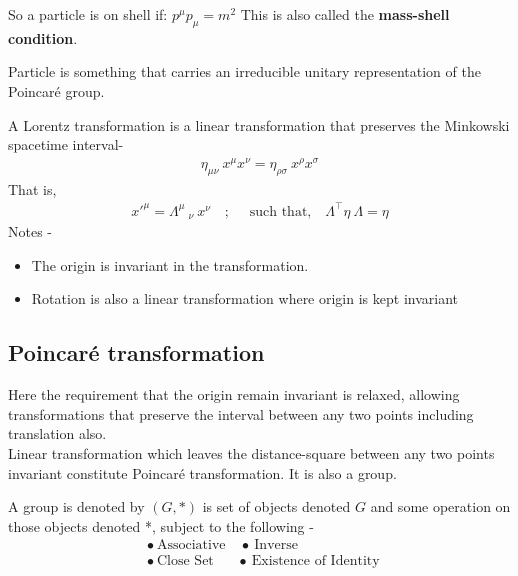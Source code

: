 \documentclass[14pt]{article} %
\begin{document}
So a particle is on shell if: $p^\mu p_\mu = m^2$
This is also called the \textbf{mass-shell condition}.

\begin{tcolorbox}[ title=\textbf{Question: What is a particle?}]
Particle is something that carries an irreducible unitary representation of the Poincaré group.
\end{tcolorbox}
\begin{tcolorbox}[ title=\textbf{Question: What is Lorentz transformation?}]
A Lorentz transformation is a linear transformation that preserves the Minkowski spacetime interval-
\begin{align*}
\eta_{\mu \nu} ~x^\mu x^\nu = \eta_{\rho \sigma} ~x^\rho x^\sigma 
\end{align*}
That is,
\begin{align*}
x'^{\mu} = \Lambda^{\mu}~_{\nu}~x^\nu \quad;\quad \text{ such that,}\quad \Lambda^\top \eta~ \Lambda=\eta
\end{align*}
Notes -
\begin{itemize}
    \item The origin is invariant in the transformation. 
    \item Rotation is also a linear transformation where origin is kept invariant
\end{itemize}
\end{tcolorbox}
\subsection{Poincaré transformation}
Here the requirement that the origin remain invariant is relaxed, allowing transformations that preserve the interval between any two points including translation also. \\

Linear transformation which leaves the distance-square between any two points invariant constitute Poincaré transformation. It is also a group.
\begin{tcolorbox}[ title=\textbf{Question: What are groups? \hfill (set + binary operation)}]
A group is denoted by $(G,*)$ is set of objects denoted $G$ and some operation on those objects denoted *, subject to the following -
\begin{align*}
&\bullet~\text{Associative} \quad \bullet~\text{Inverse} \\
&\bullet~\text{Close Set} \quad ~~~\bullet~\text{Existence of Identity }
\end{align*}
\end{tcolorbox}
\end{document}
